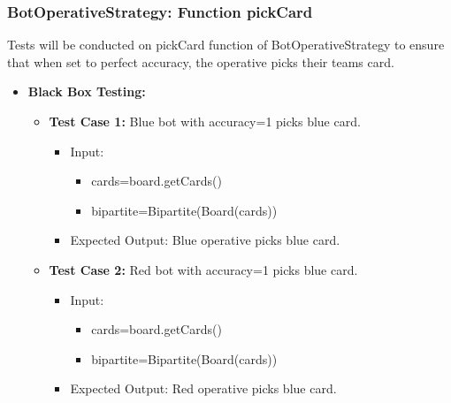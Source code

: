 \documentclass[12pt]{article}
\begin{document}

\subsubsection{BotOperativeStrategy: Function pickCard}
Tests will be conducted on pickCard function of BotOperativeStrategy to ensure that when set to perfect accuracy, the operative picks their teams card.

\begin{itemize}
    \item \textbf{Black Box Testing:}
    \begin{itemize}
       \item \textbf{Test Case 1:} Blue bot with accuracy=1 picks blue card.
            \begin{itemize}
            \item Input:
                \begin{itemize}
                    \item cards=board.getCards()
                    \item bipartite=Bipartite(Board(cards))
                \end{itemize}
            \item Expected Output: Blue operative picks blue card.
      \end{itemize}
      \item \textbf{Test Case 2:} Red bot with accuracy=1 picks blue card.
            \begin{itemize}
            \item Input:
                \begin{itemize}
                    \item cards=board.getCards()
                    \item bipartite=Bipartite(Board(cards))
                \end{itemize}
            \item Expected Output: Red operative picks blue card.
        \end{itemize}
    \end{itemize}
\end{itemize}


%
\end{document}
